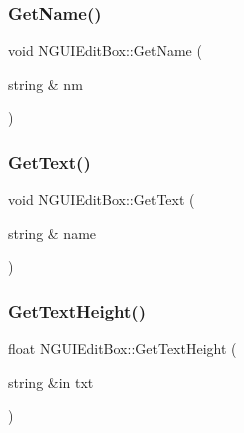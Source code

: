 \hypertarget{class_n_g_u_i_edit_box_a9f4f53fedd16e1ed7de9e1d16c01d83c}{}\label{class_n_g_u_i_edit_box_a9f4f53fedd16e1ed7de9e1d16c01d83c} 
\subsubsection{\texorpdfstring{Get\+Name()}{GetName()}}
{\footnotesize\ttfamily void N\+G\+U\+I\+Edit\+Box\+::\+Get\+Name (\begin{DoxyParamCaption}\item[{string \&}]{nm }\end{DoxyParamCaption})}

\hypertarget{class_n_g_u_i_edit_box_a7049c139843b65bf1b0ecbdf30d490e9}{}\label{class_n_g_u_i_edit_box_a7049c139843b65bf1b0ecbdf30d490e9} 
\subsubsection{\texorpdfstring{Get\+Text()}{GetText()}}
{\footnotesize\ttfamily void N\+G\+U\+I\+Edit\+Box\+::\+Get\+Text (\begin{DoxyParamCaption}\item[{string \&}]{name }\end{DoxyParamCaption})}

\hypertarget{class_n_g_u_i_edit_box_a024e6ce73b95e94b0ec2c3e37cb5ed27}{}\label{class_n_g_u_i_edit_box_a024e6ce73b95e94b0ec2c3e37cb5ed27} 
\subsubsection{\texorpdfstring{Get\+Text\+Height()}{GetTextHeight()}}
{\footnotesize\ttfamily float N\+G\+U\+I\+Edit\+Box\+::\+Get\+Text\+Height (\begin{DoxyParamCaption}\item[{string \&in}]{txt }\end{DoxyParamCaption})}

\hypertarget{class_n_g_u_i_edit_box_aa530e61a48a25e6a3184ea386162445d}{}\label{class_n_g_u_i_edit_box_aa530e61a48a25e6a3184ea386162445d} 
